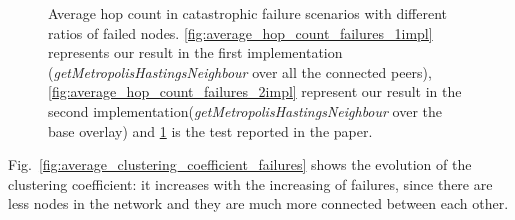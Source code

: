 \begin{figure}
\begin{subfigure}{.5\textwidth}
  \caption{}
  \label{fig:paper_average_hop_count_failures}
\end{subfigure}
\caption{Average hop count in catastrophic failure scenarios with different ratios of failed nodes.  \ref{fig:average_hop_count_failures_1impl} represents our result in the first implementation (\textit{getMetropolisHastingsNeighbour} over all the connected peers), \ref{fig:average_hop_count_failures_2impl} represent our result in the second implementation(\textit{getMetropolisHastingsNeighbour} over the base overlay) and \ref{fig:paper_average_hop_count_failures} is the test reported in the paper.}
\label{fig:robustness_hop_count_failures}
\end{figure}

Fig.~\ref{fig:average_clustering_coefficient_failures} shows the evolution of the clustering coefficient: it increases with the increasing of failures, since there are less nodes in the network and they are much more connected between each other. 

